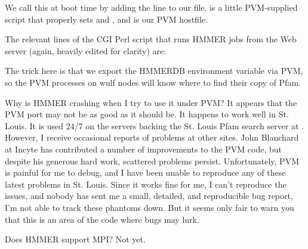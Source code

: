 We call this at boot time by adding the line  to our 
file.  is a little PVM-supplied script that properly
sets  and , and 
is our PVM hostfile.

The relevant lines of the CGI Perl script that runs HMMER jobs from
the Web server (again, heavily edited for clarity) are:


The trick here is that we export the HMMERDB environment variable via
PVM, so the PVM processes on wulf nodes will know where to find their
copy of Pfam.

\begin{srefaq}{Why is HMMER crashing when I try to use it under PVM?}
It appears that the PVM port may not be as good as it should be. It
happens to work well in St. Louis. It is used 24/7 on the servers
backing the St. Louis Pfam search server at
.
However, I receive occasional reports of problems at other
sites. John Blanchard at Incyte has contributed a number of
improvements to the PVM code, but despite his generous hard work, scattered problems
persist. Unfortunately, PVM is painful for me to debug, and I have been
unable to reproduce any of these latest problems in St. Louis. Since it works
fine for me, I can't reproduce the issues, and nobody has sent me a small,
detailed, and reproducible bug report, I'm not able to track these
phantoms down. But it seems only fair to warn you that this is an area
of the code where bugs may lurk.
\end{srefaq}

\begin{srefaq}{Does HMMER support MPI?}
Not yet.
\end{srefaq}








